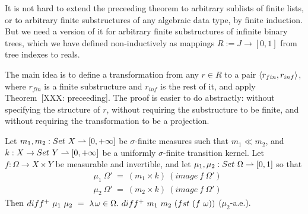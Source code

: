 It is not hard to extend the preceeding theorem to arbitrary sublists of finite lists, or to arbitrary finite substructures of any algebraic data type, by finite induction.
But we need a version of it for arbitrary finite substructures of infinite binary trees, which we have defined non-inductively as mappings $R := J \to [0,1]$ from tree indexes to reals.

The main idea is to define a transformation from any $r \in R$ to a pair $\langle{r_{fin},r_{inf}}\rangle$, where $r_{fin}$ is a finite substructure and $r_{inf}$ is the rest of it, and apply Theorem~[XXX: preceeding].
The proof is easier to do abstractly: without specifying the structure of $r$, without requiring the substructure to be finite, and without requiring the transformation to be a projection.

\begin{theorem}
Let $m_1,m_2 : Set~X \rightharpoonup [0,+\infty]$ be $\sigma$-finite measures such that $m_1 \ll m_2$, and $k : X \to Set~Y \rightharpoonup [0,+\infty]$ be a uniformly $\sigma$-finite transition kernel.
Let $f : \Omega \to X \times Y$ be measurable and invertible, and let $\mu_1,\mu_2 : Set~\Omega \rightharpoonup [0,1]$ so that
\begin{equation}
\begin{aligned}
	&\mu_1~\Omega'\ =\ (m_1 \times k)~(image~f~\Omega') \\
	&\mu_2~\Omega'\ =\ (m_2 \times k)~(image~f~\Omega')
\end{aligned}
\end{equation}
Then $diff^+~\mu_1~\mu_2\ =\ \lambda\mspace{2mu}{\omega \in \Omega}\ldotp\, diff^+~m_1~m_2~(fst~(f~\omega))$ ($\mu_2$-a.e.).
\end{theorem}
